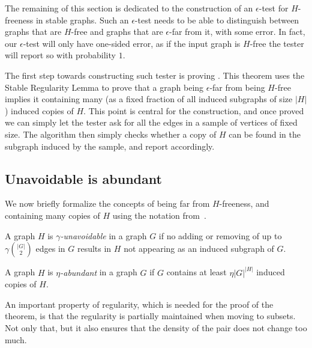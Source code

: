     The remaining of this section is dedicated to the construction of an $\epsilon$-test for $H$-freeness in stable graphs.
    Such an $\epsilon$-test needs to be able to distinguish between graphs that are $H$-free and graphs that
    are $\epsilon$-far from it, with some error.
    In fact, our $\epsilon$-test will only have one-sided error, as if the input graph is $H$-free the tester will report so
    with probability $1$.

    The first step towards constructing such tester is proving .
    This theorem uses the Stable Regularity Lemma to prove that a graph being $\epsilon$-far
    from being $H$-free implies it containing many (as a fixed fraction of all induced subgraphs of size $|H|$)
    induced copies of $H$.
    This point is central for the construction, and once proved we can simply let the tester ask for all the edges
    in a sample of vertices of fixed size.
    The algorithm then simply checks whether a copy of $H$ can be found in the subgraph induced by the sample, and report
    accordingly.

    \subsection{Unavoidable is abundant} \label{subsec:subsection_6.1}

        We now briefly formalize the concepts of being far from $H$-freeness, and containing many copies of $H$ using the
        notation from~\cite{efficient_testing_of_large_graphs}.

        \begin{definition} \label{def:unavoidable}
            A graph $H$ is \emph{$\gamma$-unavoidable} in a graph $G$ if no adding or removing of up to $\gamma {|G| \choose 2}$
            edges in $G$ results in $H$ not appearing as an induced subgraph of $G$.
        \end{definition}

        \begin{definition} \label{def:abundant}
            A graph $H$ is \emph{$\eta$-abundant} in a graph $G$ if $G$ contains at least $\eta |G|^{|H|}$
            induced copies of $H$.
        \end{definition}

        An important property of regularity, which is needed for the proof of the theorem, is that the regularity is
        partially maintained when moving to subsets.
        Not only that, but it also ensures that the density of the pair does not change too much.

